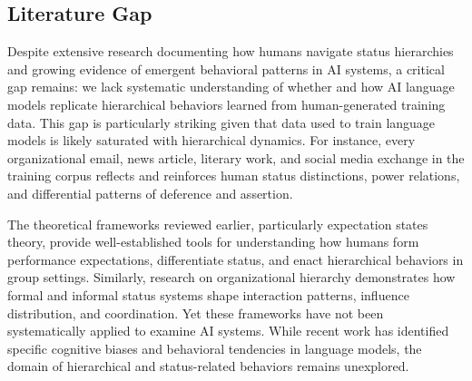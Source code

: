 
\subsection{Literature Gap}

Despite extensive research documenting how humans navigate status hierarchies and growing evidence of emergent behavioral patterns in AI systems, a critical gap remains: we lack systematic understanding of whether and how AI language models replicate hierarchical behaviors learned from human-generated training data. This gap is particularly striking given that data used to train language models is likely saturated with hierarchical dynamics. For instance, every organizational email, news article, literary work, and social media exchange in the training corpus reflects and reinforces human status distinctions, power relations, and differential patterns of deference and assertion.

The theoretical frameworks reviewed earlier, particularly expectation states theory, provide well-established tools for understanding how humans form performance expectations, differentiate status, and enact hierarchical behaviors in group settings. Similarly, research on organizational hierarchy demonstrates how formal and informal status systems shape interaction patterns, influence distribution, and coordination. Yet these frameworks have not been systematically applied to examine AI systems. While recent work has identified specific cognitive biases and behavioral tendencies in language models, the domain of hierarchical and status-related behaviors remains unexplored.

